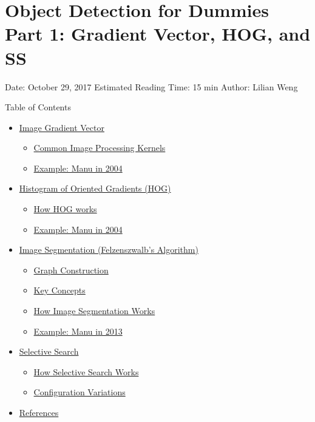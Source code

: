 \section{Object Detection for Dummies Part 1: Gradient Vector, HOG, and SS}\label{object-detection-for-dummies-part-1-gradient-vector-hog-and-ss}

Date: October 29, 2017 \textbar{} Estimated Reading Time: 15 min \textbar{} Author: Lilian Weng

{Table of Contents}

\begin{itemize}
\tightlist
\item
  \hyperref[image-gradient-vector]{Image Gradient Vector}

  \begin{itemize}
  \tightlist
  \item
    \hyperref[common-image-processing-kernels]{Common Image Processing Kernels}
  \item
    \hyperref[example-manu-in-2004]{Example: Manu in 2004}
  \end{itemize}
\item
  \hyperref[histogram-of-oriented-gradients-hog]{Histogram of Oriented Gradients (HOG)}

  \begin{itemize}
  \tightlist
  \item
    \hyperref[how-hog-works]{How HOG works}
  \item
    \hyperref[example-manu-in-2004-1]{Example: Manu in 2004}
  \end{itemize}
\item
  \hyperref[image-segmentation-felzenszwalbs-algorithm]{Image Segmentation (Felzenszwalb's Algorithm)}

  \begin{itemize}
  \tightlist
  \item
    \hyperref[graph-construction]{Graph Construction}
  \item
    \hyperref[key-concepts]{Key Concepts}
  \item
    \hyperref[how-image-segmentation-works]{How Image Segmentation Works}
  \item
    \hyperref[example-manu-in-2013]{Example: Manu in 2013}
  \end{itemize}
\item
  \hyperref[selective-search]{Selective Search}

  \begin{itemize}
  \tightlist
  \item
    \hyperref[how-selective-search-works]{How Selective Search Works}
  \item
    \hyperref[configuration-variations]{Configuration Variations}
  \end{itemize}
\item
  \hyperref[references]{References}
\end{itemize}

